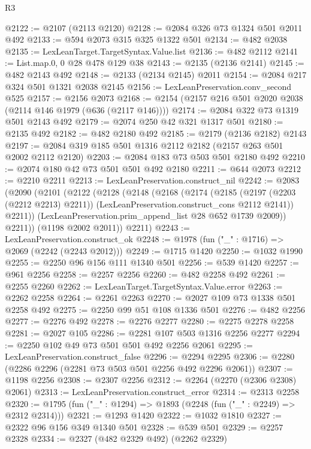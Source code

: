 \begin{lexlean}{R3}
\begin{coremodule}
@2122 := @2107 (@2113 @2120)
@2128 := @2084 @326 @73 @1324 @501 @2011 @492
@2133 := @594 @2073 @315 @325 @1322 @501
@2134 := @482 @2038
@2135 := LexLeanTarget.TargetSyntax.Value.list
@2136 := @482 @2112
@2141 := List.map.{0, 0} @28 @478 @129 @38
@2143 := @2135 (@2136 @2141)
@2145 := @482 @2143 @492
@2148 := @2133 (@2134 @2145) @2011
@2154 := @2084 @217 @324 @501 @1321 @2038 @2145
@2156 := LexLeanPreservation.conv_second @525
@2157 := @2156 @2073
@2168 := @2154 (@2157 @216 @501 @2020 @2038 (@2114 @146 @1979 (@636 (@2117 @146))))
@2174 := @2084 @322 @73 @1319 @501 @2143 @492
@2179 := @2074 @250 @42 @321 @1317 @501
@2180 := @2135 @492
@2182 := @482 @2180 @492
@2185 := @2179 (@2136 @2182) @2143
@2197 := @2084 @319 @185 @501 @1316 @2112 @2182 (@2157 @263 @501 @2002 @2112 @2120)
@2203 := @2084 @183 @73 @503 @501 @2180 @492
@2210 := @2074 @180 @42 @73 @501 @501 @492 @2180
@2211 := @644 @2073
@2212 := @2210 @2211
@2213 := LexLeanPreservation.construct_nil
@2242 := @2083
    (@2090
      (@2101
        (@2122
          (@2128
            (@2148
              (@2168
                (@2174
                  (@2185
                    (@2197 (@2203 (@2212 @2213) @2211))
                    (LexLeanPreservation.construct_cons @2112 @2141))
                  @2211))
              (LexLeanPreservation.prim_append_list @28 @652 @1739 @2009))
            @2211))
        (@1198 @2002 @2011))
      @2211)
@2243 := LexLeanPreservation.construct_ok
@2248 := @1978 (fun ("_" : @1716) => @2069 (@2242 (@2243 @2012)))
@2249 := @1715 @1420
@2250 := @1032 @1990
@2255 := @2250 @96 @156 @111 @1340 @501
@2256 := @539 @1420
@2257 := @961 @2256
@2258 := @2257 @2256
@2260 := @482 @2258 @492
@2261 := @2255 @2260
@2262 := LexLeanTarget.TargetSyntax.Value.error
@2263 := @2262 @2258
@2264 := @2261 @2263
@2270 := @2027 @109 @73 @1338 @501 @2258 @492
@2275 := @2250 @99 @51 @108 @1336 @501
@2276 := @482 @2256
@2277 := @2276 @492
@2278 := @2276 @2277
@2280 := @2275 @2278 @2258
@2281 := @2027 @105
@2286 := @2281 @107 @503 @1316 @2256 @2277
@2294 := @2250 @102 @49 @73 @501 @501 @492 @2256 @2061
@2295 := LexLeanPreservation.construct_false
@2296 := @2294 @2295
@2306 := @2280 (@2286 @2296 (@2281 @73 @503 @501 @2256 @492 @2296 @2061))
@2307 := @1198 @2256
@2308 := @2307 @2256
@2312 := @2264 (@2270 (@2306 @2308) @2061)
@2313 := LexLeanPreservation.construct_error
@2314 := @2313 @2258
@2320 := @1795 (fun ("_" : @1294) => @1893 (@2248 (fun ("_" : @2249) => @2312 @2314)))
@2321 := @1293 @1420
@2322 := @1032 @1810
@2327 := @2322 @96 @156 @349 @1340 @501
@2328 := @539 @501
@2329 := @2257 @2328
@2334 := @2327 (@482 @2329 @492) (@2262 @2329)

\end{coremodule}
\end{lexlean}
